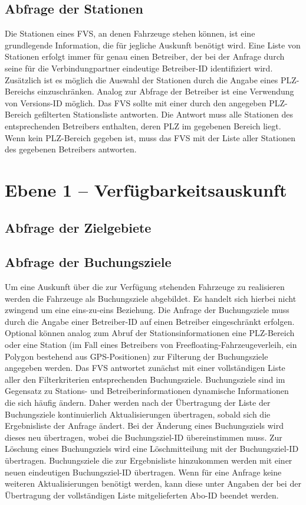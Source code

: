 \subsection{Abfrage der Stationen}
Die Stationen eines FVS, an denen Fahrzeuge stehen können, ist eine grundlegende Information, die für jegliche Auskunft benötigt wird. Eine Liste von Stationen erfolgt immer für genau einen Betreiber, der bei der Anfrage durch seine für die Verbindungpartner eindeutige Betreiber-ID identifiziert wird. Zusätzlich ist es möglich die Auswahl der Stationen durch die Angabe eines PLZ-Bereichs einzuschränken. Analog zur Abfrage der Betreiber ist eine Verwendung von Versions-ID möglich. Das FVS  sollte mit einer durch den angegeben PLZ-Bereich gefilterten Stationsliste antworten. Die Antwort muss alle Stationen des entsprechenden Betreibers enthalten, deren PLZ im gegebenen Bereich liegt. Wenn kein PLZ-Bereich gegeben ist, muss das FVS mit der Liste aller Stationen des gegebenen Betreibers antworten.

\section{Ebene 1 -- Verfügbarkeitsauskunft}

\subsection{Abfrage der Zielgebiete}

\subsection{Abfrage der Buchungsziele}
 Um eine Auskunft über die zur Verfügung stehenden Fahrzeuge zu realisieren werden die Fahrzeuge als Buchungsziele abgebildet. Es handelt sich hierbei nicht zwingend um eine eins-zu-eins Beziehung. Die Anfrage der Buchungsziele muss durch die Angabe einer Betreiber-ID auf einen Betreiber eingeschränkt erfolgen. Optional können analog zum Abruf der Stationsinformationen eine PLZ-Bereich oder eine Station (im Fall eines Betreibers von Freefloating-Fahrzeugeverleih, ein Polygon bestehend aus GPS-Positionen) zur Filterung der Buchungsziele angegeben werden. Das FVS antwortet zunächst mit einer vollständigen Liste aller den Filterkriterien entsprechenden Buchungsziele. Buchungsziele sind im Gegensatz zu Stations- und Betreiberinformationen dynamische Informationen die sich häufig ändern. Daher werden nach der Übertragung der Liste der Buchungsziele kontinuierlich Aktualisierungen übertragen, sobald sich die Ergebnisliste der Anfrage ändert. Bei der Änderung eines Buchungsziels wird dieses neu übertragen, wobei die Buchungsziel-ID übereinstimmen muss. Zur Löschung eines Buchungsziels wird eine Löschmitteilung mit der Buchungsziel-ID übertragen. Buchungsziele die zur Ergebnisliste hinzukommen werden mit einer neuen eindeutigen Buchungsziel-ID übertragen. Wenn für eine Anfrage keine weiteren Aktualisierungen benötigt werden, kann diese unter Angaben der bei der Übertragung der vollständigen Liste mitgelieferten Abo-ID beendet werden.
 
